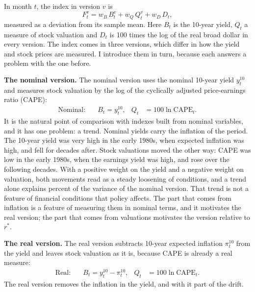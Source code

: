 \documentclass[11pt]{article}
\newcommand{\rs}{r^{*}}
\begin{document}


In month $t$, the index in version $v$ is
\begin{equation}
F_t^{v} = w_B\, B_t^{v} + w_Q\, Q_t^{v} + w_D\, D_t, \label{eq:fci}
\end{equation}
measured as a deviation from its sample mean. Here $B_t$ is the 10-year yield, $Q_t$ a measure of stock valuation and $D_t$ is 100 times the log of the real broad dollar in every version. The index comes in three versions, which differ in how the yield and stock prices are measured. I introduce them in turn, because each answers a problem with the one before.

\textbf{The nominal version.} The nominal version uses the nominal 10-year yield $y^{10}_t$ and measures stock valuation by the log of the cyclically adjusted price-earnings ratio (CAPE):
\begin{align}
\text{Nominal:}\quad & B_t = y^{10}_t, & Q_t &= 100\ln \text{CAPE}_t. \label{eq:nom}
\end{align}
It is the natural point of comparison with indexes built from nominal variables, and it has one problem: a trend. Nominal yields carry the inflation of the period. The 10-year yield was very high in the early 1980s, when expected inflation was high, and fell for decades after. Stock valuations moved the other way: CAPE was low in the early 1980s, when the earnings yield was high, and rose over the following decades. With a positive weight on the yield and a negative weight on valuation, both movements read as a steady loosening of conditions, and a trend alone explains  percent of the variance of the nominal version. That trend is not a feature of financial conditions that policy affects. The part that comes from inflation is a feature of measuring them in nominal terms, and it motivates the real version; the part that comes from valuations motivates the version relative to $\rs$.

\textbf{The real version.} The real version subtracts 10-year expected inflation $\pi^{10}_t$ from the yield and leaves stock valuation as it is, because CAPE is already a real measure:
\begin{align}
\text{Real:}\quad & B_t = y^{10}_t - \pi^{10}_t, & Q_t &= 100\ln \text{CAPE}_t. \label{eq:real}
\end{align}
The real version removes the inflation in the yield, and with it part of the drift.
\end{document}
